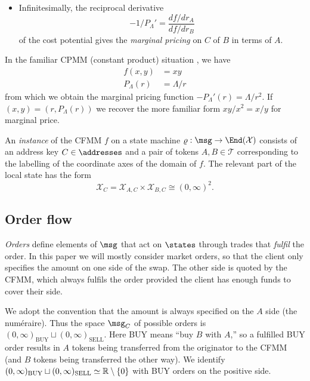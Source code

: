 \documentclass[a4paper,11pt]{article}
\begin{document}
\begin{itemize}
  \item
    Infinitesimally, the reciprocal derivative 
    \[
      -1/P_\Lambda' = \frac{df/dr_A}{df/dr_B}
    \]     
    of the cost potential gives the \emph{marginal pricing} on $C$ of $B$ in terms of $A$.
  
\end{itemize}

\begin{example}
\label{cpmm-pricing}

  In the familiar CPMM (constant product) situation \cite{adams2020uniswap}, we have
  \begin{align*}
    f(x,y) &= xy \\
    P_\Lambda(r) &= \Lambda/r 
  \end{align*}
  from which we obtain the marginal pricing function $-P_\Lambda'(r) = \Lambda/r^2$. If $(x,y) = (r, P_\Lambda(r))$ we recover the more familiar form $xy/x^2=x/y$ for marginal price.

\end{example}


An \emph{instance} of the CFMM $f$ on a state machine $\varrho:\msg\rightarrow\End(\mathcal{X})$ consists of an address key $C\in\addresses$ and a pair of tokens $A,B\in\mathcal{T}$ corresponding to the labelling of the coordinate axes of the domain of $f$.
%
The relevant part of the local state has the form
\[
  \mathcal{X}_C = \mathcal{X}_{A,C}\times\mathcal{X}_{B,C} \cong (0,\infty)^2.
\]
%

\subsection{Order flow}

\emph{Orders} define elements of $\msg$ that act on $\states$ through trades that \emph{fulfil} the order.
%
In this paper we will mostly consider market orders, so that the client only specifies the amount on one side of the swap.
%
The other side is quoted by the CFMM, which always fulfils the order provided the client has enough funds to cover their side.

We adopt the convention that the amount is always specified on the $A$ side (the num\'eraire).
%
Thus the space $\msg_C$ of possible orders is $(0,\infty)_\mathrm{BUY}\sqcup(0,\infty)_\mathrm{SELL}$.
%
Here BUY means ``buy $B$ with $A$,'' so a fulfilled BUY order results in $A$ tokens being transferred from the originator to the CFMM (and $B$ tokens being transferred the other way). 
%
We identify $(0,\infty)_\mathrm{BUY}\sqcup(0,\infty)_\mathrm{SELL}\simeq \mathbb R\setminus\{0\}$ with BUY orders on the positive side.
\end{document}
